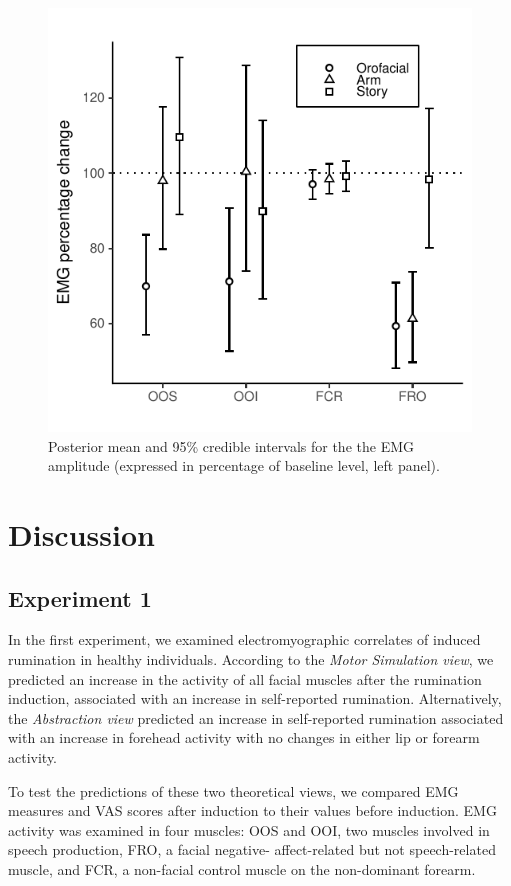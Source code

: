 \documentclass[a4paper,12pt,twoside,onecolumn,openright,final,oldfontcommands]{memoir}
\begin{document}
\begin{figure}[ht]

{\centering \includegraphics[width=0.75\linewidth]{assets/emg_fig3} 

}

\caption{Posterior mean and 95\% credible intervals for the the EMG amplitude (expressed in percentage of baseline level, left panel).}\label{fig:resultsemgfig3}
\end{figure}

\hypertarget{discussion}{%
\section{Discussion}\label{discussion}}

\hypertarget{experiment-1}{%
\subsection{Experiment 1}\label{experiment-1}}

In the first experiment, we examined electromyographic correlates of induced rumination in healthy individuals. According to the \emph{Motor Simulation view}, we predicted an increase in the activity of all facial muscles after the rumination induction, associated with an increase in self-reported rumination. Alternatively, the \emph{Abstraction view} predicted an increase in self-reported rumination associated with an increase in forehead activity with no changes in either lip or forearm activity.

To test the predictions of these two theoretical views, we compared EMG measures and VAS scores after induction to their values before induction. EMG activity was examined in four muscles: OOS and OOI, two muscles involved in speech production, FRO, a facial negative- affect-related but not speech-related muscle, and FCR, a non-facial control muscle on the non-dominant forearm.
\end{document}
